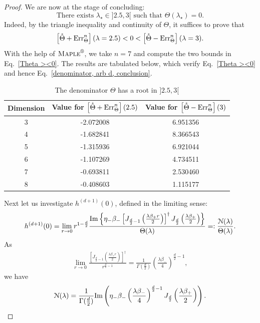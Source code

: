\documentclass[11pt,a4paper,english,reqno]{amsart}
\theoremstyle{plain}
\newcommand{\1}{\mathbbm{1}}
\begin{document}
\begin{proof}
We are now at the stage of concluding:
\begin{equation}\label{denominator, arb d, conclusion}
\text{There exists $\lambda_\star \in ]2.5,3[$ such that $\Theta(\lambda_\star)=0$}.
\end{equation}
Indeed, by the triangle inequality and continuity of $\Theta$, it suffices to prove that 
\begin{equation}\label{Theta ><0}
\left[\mathring{\Theta} +{\rm Err}_\Theta^n\right](\lambda= 2.5) < 0 < \left[\mathring{\Theta} -{\rm Err}_\Theta^n\right](\lambda=3).
\end{equation}
With the help of $\textsc{Maple}^\text{\textregistered}$, we take $n=7$ and compute the two bounds in Eq.~\eqref{Theta ><0}. The results are tabulated below, which verify Eq.~\eqref{Theta ><0} and hence Eq.~\eqref{denominator, arb d, conclusion}.
\begin{table}[ht]
\caption{The denominator $\Theta$ has a root in $]2.5,3[$} %
\centering %
\begin{tabular}{c c c} %
\hline\hline %
Dimension & Value for $\left[\mathring{\Theta} +{\rm Err}_\Theta^n\right](2.5)$ & Value for $\left[\mathring{\Theta} -{\rm Err}_\Theta^n\right](3)$ \\ [0.5ex] %
\hline %
3 & -2.072008 & 6.951356 \\ %
4 & -1.682841 & 8.366543 \\
5 & -1.315936 & 6.921044  \\
6 & -1.107269 & 4.734511  \\
7 & -0.693811 & 2.530460 \\
8 & -0.408603 & 1.115177 \\ [1ex] %
\hline %
\end{tabular}
\label{table:arb d}
\end{table}


Next let us investigate $h^{(d+1)}(0)$, defined in the limiting sense:
\begin{eqnarray*}
h^{(d+1)}(0) = \lim_{r \rightarrow 0 }r^{1-\frac{d}{2}  }\frac{{\rm Im}\left\{\eta_{-}\beta_{-}\left[J_{\frac{d}{2}-1}\left(\frac{\lambda\beta_+r}{2}\right)\right]^\dagger J_{\frac{d}{2}}\left(\frac{\lambda\beta_+ }{2}\right) \right\}}{\Theta(\lambda)} =: \frac{\mathcal{N}(\lambda)}{\Theta(\lambda)}.
\end{eqnarray*}
As 
\begin{eqnarray*}
\lim_{r \rightarrow 0}\frac{\left[J_{\frac{d}{2}-1}\left(\frac{\lambda\beta_+ r}{2}\right)\right]^\dagger }{ r^{\frac{d}{2} - 1}} = \frac{1}{\Gamma(\frac{d}{2})} \left(\frac{\lambda \beta_{-}}{4}\right)^{\frac{d}{2}-1},
\end{eqnarray*}
we have
\begin{align*}
\mathcal{N}(\lambda) = \frac{1}{\Gamma(\frac{d}{2})} {\rm Im} \left( \eta_{-}\beta_{-}\left(\frac{\lambda \beta_{-}}{4}\right)^{\frac{d}{2}-1} J_{\frac{d}{2}}\left(\frac{\lambda\beta_+ }{2}\right)\right).
\end{align*}



\end{proof}
\end{document}
